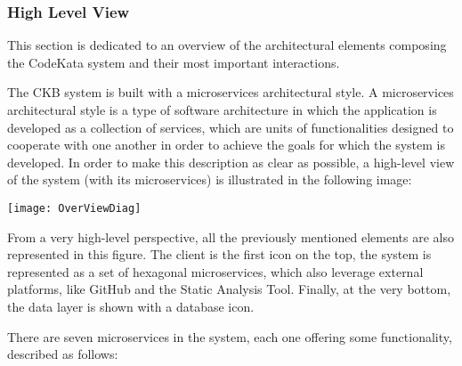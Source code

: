 \subsubsection{High Level View}
This section is dedicated to an overview of the architectural elements composing the CodeKata system and their most important interactions. 

The CKB system is built with a microservices architectural style. A microservices architectural style is a type of software architecture in which the application is developed as a collection of services, which are units of functionalities designed to cooperate with one another in order to achieve the goals for which the system is developed. In order to make this description as clear as possible, a high-level view of the system (with its microservices) is illustrated in the following image:
\begin{center}
\texttt{[image: OverViewDiag]}
\end{center}


From a very high-level perspective, all the previously mentioned elements are also represented in this figure. The client is the first icon on the top, the \app system is represented as a set of hexagonal microservices, which also leverage external platforms, like GitHub and the Static Analysis Tool. Finally, at the very bottom, the data layer is shown with a database icon.

There are seven microservices in the \app system, each one offering some functionality, described as follows:

